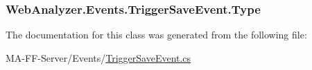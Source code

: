 \subsubsection[{Type}]{ Web\+Analyzer.\+Events.\+Trigger\+Save\+Event.\+Type\hspace{0.3cm}{\ttfamily [get]}}\label{class_web_analyzer_1_1_events_1_1_trigger_save_event_af54a984dcddf28a5f41eb60d11b3d1b1}


The documentation for this class was generated from the following file\+:\begin{DoxyCompactItemize}
\item 
M\+A-\/\+F\+F-\/\+Server/\+Events/\hyperlink{_trigger_save_event_8cs}{Trigger\+Save\+Event.\+cs}\end{DoxyCompactItemize}
